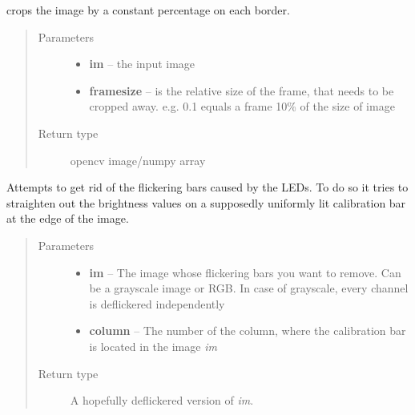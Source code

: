 \documentclass[a4paper,10pt,openany,oneside]{sphinxmanual}
\begin{document}

\begin{fulllineitems}
\label{index:scripts.image_processing.cropFrame}
crops the image by a constant percentage on each border.
\begin{quote}\begin{description}
\item[{Parameters}] \leavevmode\begin{itemize}
\item {}
\textbf{im} -- the input image

\item {}
\textbf{framesize} -- is the relative size of the frame, that needs to be cropped away. e.g. 0.1 equals a frame 10\% of the size of image

\end{itemize}

\item[{Return type}] \leavevmode
opencv image/numpy array

\end{description}\end{quote}

\end{fulllineitems}


\begin{fulllineitems}
\label{index:scripts.image_processing.deflickerImage}
Attempts to get rid of the flickering bars caused by the LEDs. To do so it
tries to straighten out the brightness values on a supposedly uniformly lit
calibration bar at the edge of the image.
\begin{quote}\begin{description}
\item[{Parameters}] \leavevmode\begin{itemize}
\item {}
\textbf{im} -- The image whose flickering bars you want to remove. Can be a grayscale image or RGB. In case of grayscale, every channel is deflickered independently

\item {}
\textbf{column} -- The number of the column, where the calibration bar is located in the image \emph{im}

\end{itemize}

\item[{Return type}] \leavevmode
{}   A hopefully deflickered version of \emph{im}.

\end{description}\end{quote}

\end{fulllineitems}
\end{document}
